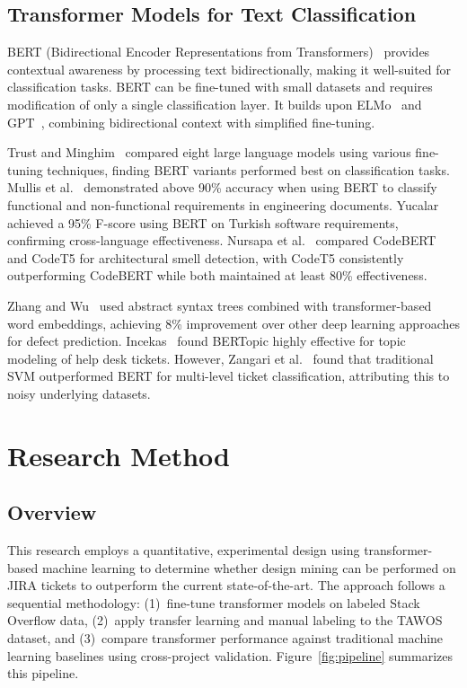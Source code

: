 \documentclass[preprint,12pt]{elsarticle}
\begin{document}
\subsection{Transformer Models for Text Classification}

BERT (Bidirectional Encoder Representations from Transformers)~\cite{devlin2019} provides contextual awareness by processing text bidirectionally, making it well-suited for classification tasks. BERT can be fine-tuned with small datasets and requires modification of only a single classification layer. It builds upon ELMo~\cite{peters2018} and GPT~\cite{radford2018}, combining bidirectional context with simplified fine-tuning.

Trust and Minghim~\cite{trust2024} compared eight large language models using various fine-tuning techniques, finding BERT variants performed best on classification tasks. Mullis et al.~\cite{mullis2023} demonstrated above 90\% accuracy when using BERT to classify functional and non-functional requirements in engineering documents. Yucalar~\cite{yucalar2023} achieved a 95\% F-score using BERT on Turkish software requirements, confirming cross-language effectiveness. Nursapa et al.~\cite{nursapa2025} compared CodeBERT and CodeT5 for architectural smell detection, with CodeT5 consistently outperforming CodeBERT while both maintained at least 80\% effectiveness.

Zhang and Wu~\cite{zhang2020} used abstract syntax trees combined with transformer-based word embeddings, achieving 8\% improvement over other deep learning approaches for defect prediction. Incekas~\cite{incekas2024} found BERTopic highly effective for topic modeling of help desk tickets. However, Zangari et al.~\cite{zangari2023} found that traditional SVM outperformed BERT for multi-level ticket classification, attributing this to noisy underlying datasets.

\section{Research Method}

\subsection{Overview}

This research employs a quantitative, experimental design using transformer-based machine learning to determine whether design mining can be performed on JIRA tickets to outperform the current state-of-the-art. The approach follows a sequential methodology: (1)~fine-tune transformer models on labeled Stack Overflow data, (2)~apply transfer learning and manual labeling to the TAWOS dataset, and (3)~compare transformer performance against traditional machine learning baselines using cross-project validation. Figure~\ref{fig:pipeline} summarizes this pipeline.
\end{document}
